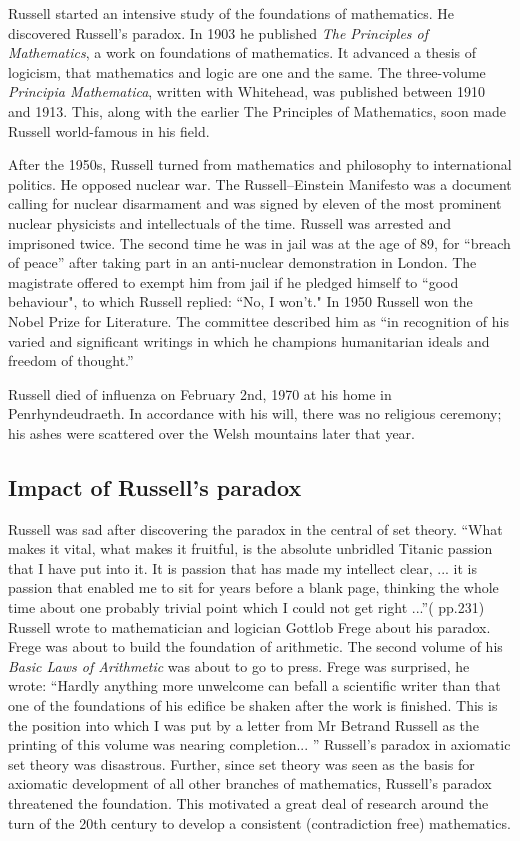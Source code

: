 \documentclass[b5paper]{article}
\begin{document}
Russell started an intensive study of the foundations of mathematics. He discovered Russell's paradox. In 1903 he published {\em The Principles of Mathematics}, a work on foundations of mathematics. It advanced a thesis of logicism, that mathematics and logic are one and the same. The three-volume {\em Principia Mathematica}, written with Whitehead, was published between 1910 and 1913. This, along with the earlier The Principles of Mathematics, soon made Russell world-famous in his field.

After the 1950s, Russell turned from mathematics and philosophy to international politics. He opposed nuclear war. The Russell–Einstein Manifesto was a document calling for nuclear disarmament and was signed by eleven of the most prominent nuclear physicists and intellectuals of the time. Russell was arrested and imprisoned twice. The second time he was in jail was at the age of 89, for ``breach of peace'' after taking part in an anti-nuclear demonstration in London. The magistrate offered to exempt him from jail if he pledged himself to ``good behaviour", to which Russell replied: ``No, I won't." In 1950 Russell won the Nobel Prize for Literature. The committee described him as ``in recognition of his varied and significant writings in which he champions humanitarian ideals and freedom of thought.''

Russell died of influenza on February 2nd, 1970 at his home in Penrhyndeudraeth. In accordance with his will, there was no religious ceremony; his ashes were scattered over the Welsh mountains later that year.

\subsection{Impact of Russell's paradox}

Russell was sad after discovering the paradox in the central of set theory. ``What makes it vital, what makes it fruitful, is the absolute unbridled Titanic passion that I have put into it. It is passion that has made my intellect clear, ... it is passion that enabled me to sit for years before a blank page, thinking the whole time about one probably trivial point which I could not get right ...''(\cite{HanXueTao16} pp.231) Russell wrote to mathematician and logician Gottlob Frege about his paradox. Frege was about to build the foundation of arithmetic. The second volume of his {\em Basic Laws of Arithmetic} was about to go to press. Frege was surprised, he wrote: ``Hardly anything more unwelcome can befall a scientific writer than that one of the foundations of his edifice be shaken after the work is finished. This is the position into which I was put by a letter from Mr Betrand Russell as the printing of this volume was nearing completion... '' Russell's paradox in axiomatic set theory was disastrous. Further, since set theory was seen as the basis for axiomatic development of all other branches of mathematics, Russell's paradox threatened the foundation. This motivated a great deal of research around the turn of the 20th century to develop a consistent (contradiction free) mathematics.
\end{document}
